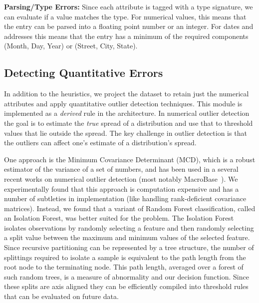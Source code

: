\vspace{0.5em}
\noindent\textbf{Parsing/Type Errors: } Since each attribute is tagged with a type signature, we can evaluate if a value matches the type. For numerical values, this means that the entry can be parsed into a floating point number or an integer. For dates and addresses this means that the entry has a minimum of the required components (Month, Day, Year) or (Street, City, State).

\subsection{Detecting Quantitative Errors}
In addition to the heuristics, we project the dataset to retain just the numerical attributes and apply quantitative outlier detection techniques.
This module is implemented as a \emph{derived} rule in the architecture.
In numerical outlier detection the goal is to estimate the \emph{true} spread of a distribution and use that to threshold values that lie outside the spread.
The key challenge in outlier detection is that the outliers can affect one's estimate of a distribution's spread.

One approach is the Minimum Covariance Determinant (MCD), which is a robust estimator of the variance of a set of numbers, and has been used in a several recent works on numerical outlier detection (most notably MacroBase~\cite{bailis2016macrobase}).
We experimentally found that this approach is computation expensive and has a number of subtleties in implementation (like handling rank-deficient covariance matrices).
Instead, we found that a variant of Random Forest classification, called an Isolation Forest, was better suited for the problem.
The Isolation Forest isolates observations by randomly selecting a feature and then randomly selecting a split value between the maximum and minimum values of the selected feature.
Since recursive partitioning can be represented by a tree structure, the number of splittings required to isolate a sample is equivalent to the path length from the root node to the terminating node.
This path length, averaged over a forest of such random trees, is a measure of abnormality and our decision function.
Since these splits are axis aligned they can be efficiently compiled into threshold rules that can be evaluated on future data.

